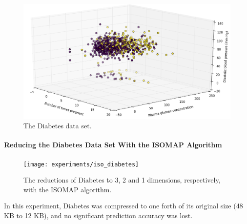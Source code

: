 \begin{figure}[H]
	\centering
	\includegraphics[width=\linewidth]{img/datasets/diabetes}
	\captionsetup{justification=centering}
	\caption{The Diabetes data set.}
	\label{fig:dsdiabetes}
\end{figure}

\newpage
\paragraph{Reducing the Diabetes Data Set With the ISOMAP Algorithm}

\begin{figure}[H]
	\centering
	\captionsetup{justification=centering}
	\texttt{[image: experiments/iso\_diabetes]}
	\caption{The reductions of Diabetes to 3, 2 and 1 dimensions, respectively, with the ISOMAP algorithm.}
	\label{fig:dsdiabetesiso}
\end{figure}

In this experiment, Diabetes was compressed to one forth of its original size (48 KB to 12 KB), and no significant prediction accuracy was lost.
